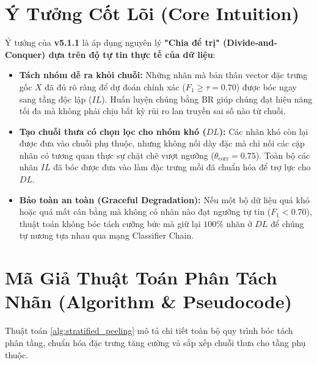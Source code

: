 \documentclass[11pt,a4paper]{article}
\begin{document}
\section{Ý Tưởng Cốt Lõi (Core Intuition)}
Ý tưởng của \textbf{v5.1.1} là áp dụng nguyên lý \textbf{"Chia để trị" (Divide-and-Conquer) dựa trên độ tự tin thực tế của dữ liệu}:
\begin{itemize}
    \item \textbf{Tách nhóm dễ ra khỏi chuỗi:} Những nhãn mà bản thân vector đặc trưng gốc $X$ đã đủ rõ ràng để dự đoán chính xác ($F_1 \ge \tau = 0.70$) được bóc ngay sang tầng độc lập ($IL$). Huấn luyện chúng bằng BR giúp chúng đạt hiệu năng tối đa mà không phải chịu bất kỳ rủi ro lan truyền sai số nào từ chuỗi.
    \item \textbf{Tạo chuỗi thưa có chọn lọc cho nhóm khó ($DL$):} Các nhãn khó còn lại được đưa vào chuỗi phụ thuộc, nhưng không nối dày đặc mà chỉ nối các cặp nhãn có tương quan thực sự chặt chẽ vượt ngưỡng ($\theta_{\text{corr}} = 0.75$). Toàn bộ các nhãn $IL$ đã bóc được đưa vào làm đặc trưng mồi đã chuẩn hóa để trợ lực cho $DL$.
    \item \textbf{Bảo toàn an toàn (Graceful Degradation):} Nếu một bộ dữ liệu quá khó hoặc quá mất cân bằng mà không có nhãn nào đạt ngưỡng tự tin ($F_1 < 0.70$), thuật toán không bóc tách cưỡng bức mà giữ lại $100\%$ nhãn ở $DL$ để chúng tự nương tựa nhau qua mạng Classifier Chain.
\end{itemize}

\section{Mã Giả Thuật Toán Phân Tách Nhãn (Algorithm \& Pseudocode)}
Thuật toán \ref{alg:stratified_peeling} mô tả chi tiết toàn bộ quy trình bóc tách phân tầng, chuẩn hóa đặc trưng tăng cường và sắp xếp chuỗi thưa cho tầng phụ thuộc.
\end{document}
